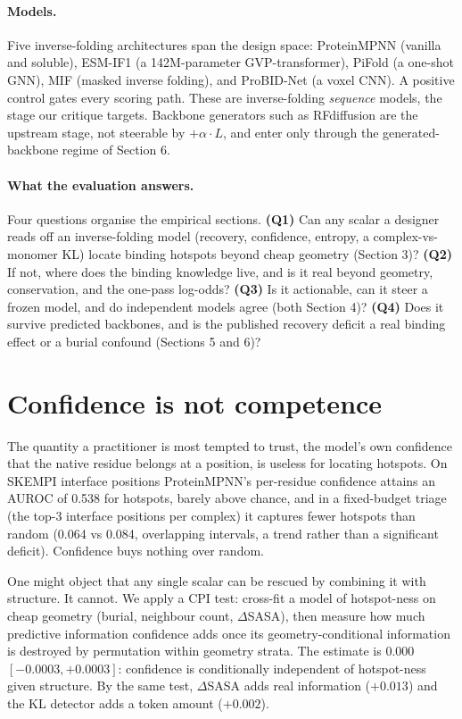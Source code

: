 \documentclass{article} %
\begin{document}
\paragraph{Models.} Five inverse-folding architectures span the design space: ProteinMPNN
\citep{dauparas2022proteinmpnn} (vanilla and soluble), ESM-IF1 \citep{hsu2022esmif} (a 142M-parameter
GVP-transformer), PiFold \citep{gao2023pifold} (a one-shot GNN), MIF \citep{yang2023mif} (masked inverse folding),
and ProBID-Net \citep{chen2024probidnet} (a voxel CNN). A positive control gates every scoring path. These are
inverse-folding \emph{sequence} models, the stage our critique targets. Backbone generators such as RFdiffusion
\citep{watson2023rfdiffusion} are the upstream stage, not steerable by $+\alpha \cdot L$, and enter only through the
generated-backbone regime of Section 6.

\paragraph{What the evaluation answers.} Four questions organise the empirical sections. \textbf{(Q1)} Can any
scalar a designer reads off an inverse-folding model (recovery, confidence, entropy, a complex-vs-monomer KL)
locate binding hotspots beyond cheap geometry (Section 3)? \textbf{(Q2)} If not, where does the binding knowledge
live, and is it real beyond geometry, conservation, and the one-pass log-odds? \textbf{(Q3)} Is it
actionable, can it steer a frozen model, and do independent models agree (both Section 4)? \textbf{(Q4)} Does it survive
predicted backbones, and is the published recovery deficit a real binding effect or a burial confound (Sections 5
and 6)?

\section{Confidence is not competence}

The quantity a practitioner is most tempted to trust, the model's own confidence that the native residue belongs
at a position, is useless for locating hotspots. On SKEMPI interface positions ProteinMPNN's per-residue
confidence attains an AUROC of 0.538 for hotspots, barely above chance, and in a fixed-budget triage (the top-3
interface positions per complex) it captures fewer hotspots than random (0.064 vs 0.084, overlapping intervals, a
trend rather than a significant deficit). Confidence buys nothing over random.

One might object that any single scalar can be rescued by combining it with structure. It cannot. We apply a CPI
test: cross-fit a model of hotspot-ness on cheap geometry (burial, neighbour count, $\Delta$SASA), then measure
how much predictive information confidence adds once its geometry-conditional information is destroyed by
permutation within geometry strata. The estimate is $0.000$ $[-0.0003, +0.0003]$: confidence is conditionally
independent of hotspot-ness given structure. By the same test, $\Delta$SASA adds real information ($+0.013$) and
the KL detector adds a token amount ($+0.002$).
\end{document}
